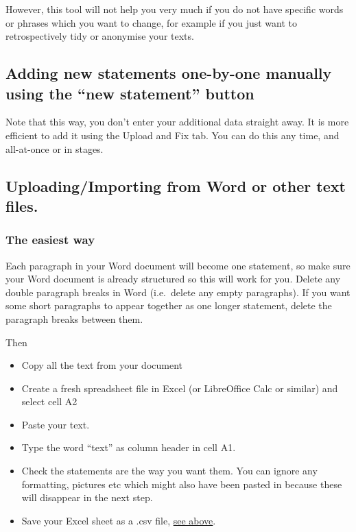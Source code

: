\documentclass[
]{book}
\begin{document}
However, this tool will not help you very much if you do not have specific words or phrases which you want to change, for example if you just want to retrospectively tidy or anonymise your texts.

\hypertarget{adding-new-statements-one-by-one-manually-using-the-new-statement-button}{%
\subsection{Adding new statements one-by-one manually using the ``new statement'' button}\label{adding-new-statements-one-by-one-manually-using-the-new-statement-button}}

Note that this way, you don't enter your additional data straight away. It is more efficient to add it using the Upload and Fix tab. You can do this any time, and all-at-once or in stages.

\hypertarget{uploadingimporting-from-word-or-other-text-files.}{%
\subsection{Uploading/Importing from Word or other text files.}\label{uploadingimporting-from-word-or-other-text-files.}}

\hypertarget{the-easiest-way}{%
\subsubsection{The easiest way}\label{the-easiest-way}}

Each paragraph in your Word document will become one statement, so make sure your Word document is already structured so this will work for you. Delete any double paragraph breaks in Word (i.e.~delete any empty paragraphs). If you want some short paragraphs to appear together as one longer statement, delete the paragraph breaks between them.

Then

\begin{itemize}
\item
  Copy all the text from your document
\item
  Create a fresh spreadsheet file in Excel (or LibreOffice Calc or similar) and select cell A2
\item
  Paste your text.
\item
  Type the word ``text'' as column header in cell A1.
\item
  Check the statements are the way you want them. You can ignore any formatting, pictures etc which might also have been pasted in because these will disappear in the next step.
\item
  Save your Excel sheet as a .csv file, \protect\hyperlink{preparing-and-uploading-your-.csv-file}{see above}.
\end{itemize}
\end{document}
